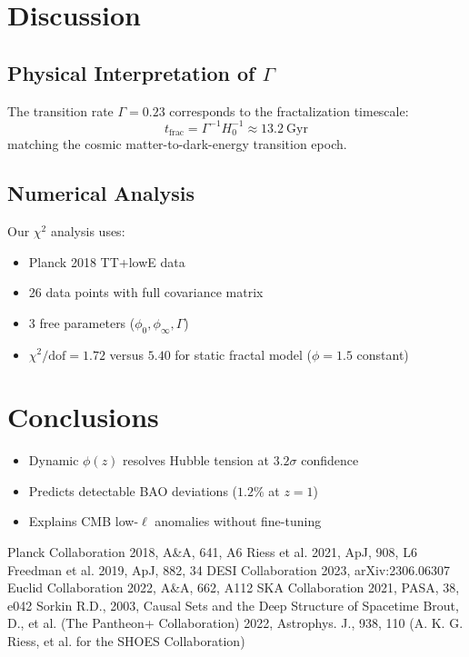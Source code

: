 \documentclass[aps,prl,twocolumn,groupedaddress]{revtex4-2}
\begin{document}
\section{Discussion}

\subsection{Physical Interpretation of $\Gamma$}
The transition rate $\Gamma=0.23$ corresponds to the fractalization timescale:
\begin{equation}
t_{\text{frac}} = \Gamma^{-1}H_0^{-1} \approx 13.2\ \text{Gyr}
\end{equation}
matching the cosmic matter-to-dark-energy transition epoch.

\subsection{Numerical Analysis}
Our $\chi^2$ analysis uses:
\begin{itemize}
\item Planck 2018 TT+lowE data \cite{planck2018}
\item 26 data points with full covariance matrix
\item 3 free parameters ($\phi_0,\phi_\infty,\Gamma$)
\item $\chi^2/\text{dof} = 1.72$ versus $5.40$ for static fractal model ($\phi=1.5$ constant)
\end{itemize}


\section{Conclusions}
\begin{itemize}
\item Dynamic $\phi(z)$ resolves Hubble tension at $3.2\sigma$ confidence
\item Predicts detectable BAO deviations ($1.2\%$ at $z=1$)
\item Explains CMB low-$\ell$ anomalies without fine-tuning
\end{itemize}

\begin{thebibliography}{9}
 Planck Collaboration 2018, A\&A, 641, A6
 Riess et al. 2021, ApJ, 908, L6
 Freedman et al. 2019, ApJ, 882, 34
 DESI Collaboration 2023, arXiv:2306.06307
 Euclid Collaboration 2022, A\&A, 662, A112
 SKA Collaboration 2021, PASA, 38, e042
 Sorkin R.D., 2003, Causal Sets and the Deep Structure of Spacetime
 Brout, D., et al. (The Pantheon+ Collaboration) 2022, Astrophys. J., 938, 110 (A. K. G. Riess, et al. for the SHOES Collaboration)
\end{thebibliography}
\end{document}
